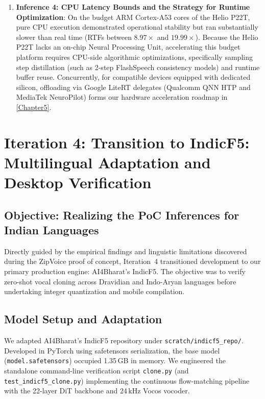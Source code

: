 \begin{enumerate}
    \item \textbf{Inference 4: CPU Latency Bounds and the Strategy for Runtime Optimization}:
    On the budget ARM Cortex-A53 cores of the Helio P22T, pure CPU execution demonstrated operational stability but ran substantially slower than real time (RTFs between $8.97\times$ and $19.99\times$). Because the Helio P22T lacks an on-chip Neural Processing Unit, accelerating this budget platform requires CPU-side algorithmic optimizations, specifically sampling step distillation (such as 2-step FlashSpeech consistency models) and runtime buffer reuse. Concurrently, for compatible devices equipped with dedicated silicon, offloading via Google LiteRT delegates (Qualcomm QNN HTP and MediaTek NeuroPilot) forms our hardware acceleration roadmap in \cref{Chapter5}.
\end{enumerate}

\section{Iteration 4: Transition to IndicF5: Multilingual Adaptation and Desktop Verification}
\subsection{Objective: Realizing the PoC Inferences for Indian Languages}
Directly guided by the empirical findings and linguistic limitations discovered during the ZipVoice proof of concept, Iteration~4 transitioned development to our primary production engine: AI4Bharat's IndicF5. The objective was to verify zero-shot vocal cloning across Dravidian and Indo-Aryan languages before undertaking integer quantization and mobile compilation.

\subsection{Model Setup and Adaptation}
We adapted AI4Bharat's IndicF5 repository under \texttt{scratch/indicf5\_repo/}. Developed in PyTorch using safetensors serialization, the base model (\texttt{model.safetensors}) occupied 1.35\,GB in memory. We engineered the standalone command-line verification script \texttt{clone.py} (and \texttt{test\_indicf5\_clone.py}) implementing the continuous flow-matching pipeline with the 22-layer DiT backbone and 24\,kHz Vocos vocoder.

